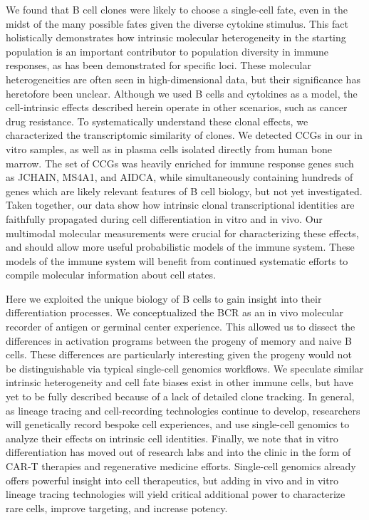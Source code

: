 We found that B cell clones were likely to choose a single-cell fate, even in the midst of the many possible fates given the diverse cytokine stimulus. This fact holistically demonstrates how intrinsic molecular heterogeneity in the starting population is an important contributor to population diversity in immune responses, as has been demonstrated for specific loci\cite{wu_intrinsic_2017}. These molecular heterogeneities are often seen in high-dimensional data, but their significance has heretofore been unclear. Although we used B cells and cytokines as a model, the cell-intrinsic effects described herein operate in other scenarios, such as cancer drug resistance\cite{goyal_pre-determined_2021}. To systematically understand these clonal effects, we characterized the transcriptomic similarity of clones. We detected CCGs in our in vitro samples, as well as in plasma cells isolated directly from human bone marrow. The set of CCGs was heavily enriched for immune response genes such as JCHAIN, MS4A1, and AIDCA, while simultaneously containing hundreds of genes which are likely relevant features of B cell biology, but not yet investigated. Taken together, our data show how intrinsic clonal transcriptional identities are faithfully propagated during cell differentiation in vitro and in vivo. Our multimodal molecular measurements were crucial for characterizing these effects, and should allow more useful probabilistic models of the immune system\cite{hodgkin_modifying_2018}. These models of the immune system will benefit from continued systematic efforts to compile molecular information about cell states\cite{tabula_sapiens_consortium_tabula_2022}.

Here we exploited the unique biology of B cells to gain insight into their differentiation processes. We conceptualized the BCR as an in vivo molecular recorder of antigen or germinal center experience. This allowed us to dissect the differences in activation programs between the progeny of memory and naive B cells. These differences are particularly interesting given the progeny would not be distinguishable via typical single-cell genomics workflows. We speculate similar intrinsic heterogeneity and cell fate biases exist in other immune cells\cite{sanmiguel_hand_2020}, but have yet to be fully described because of a lack of detailed clone tracking. In general, as lineage tracing and cell-recording technologies continue to develop, researchers will genetically record bespoke cell experiences, and use single-cell genomics to analyze their effects on intrinsic cell identities\cite{chen_connecting_2022}. Finally, we note that in vitro differentiation has moved out of research labs and into the clinic in the form of CAR-T therapies and regenerative medicine efforts. Single-cell genomics already offers powerful insight into cell therapeutics\cite{bode_exploiting_2021}, but adding in vivo and in vitro lineage tracing technologies will yield critical additional power to characterize rare cells, improve targeting, and increase potency.


